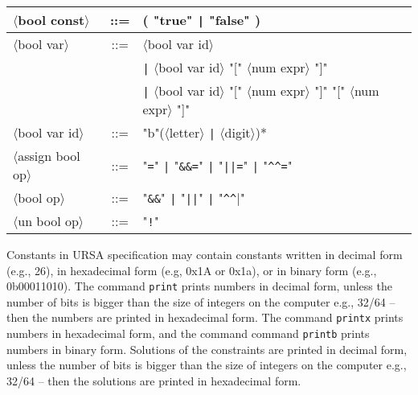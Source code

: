 \documentclass[a4paper]{article}
\begin{document}
{\begin{center}
\begin{tabular}{lcl}
$\langle$bool const$\rangle$ & ::= & ( "true" \verb_|_ "false" )                                                                              \\ \hline

$\langle$bool var$\rangle$ & ::= & $\langle$bool var id$\rangle$                                                                              \\
               &     &     \verb_|_ $\langle$bool var id$\rangle$ "[" $\langle$num expr$\rangle$ "]"                                          \\
               &     &     \verb_|_ $\langle$bool var id$\rangle$ "[" $\langle$num expr$\rangle$ "]" "[" $\langle$num expr$\rangle$ "]"       \\ \hline

$\langle$bool var id$\rangle$ & ::= & "b"($\langle$letter$\rangle$ \verb_|_ $\langle$digit$\rangle$)*                                         \\ \hline

$\langle$assign bool op$\rangle$ & ::= & "\verb|=|" \verb_|_ "\verb|&&=|"  \verb_|_ "\verb_||=_" \verb_|_ "\verb|^^=|"                        \\ \hline
$\langle$bool op$\rangle$        & ::= & "\verb|&&|"  \verb_|_ "\verb_||_" \verb_|_ "\verb|^^|"                                               \\ \hline
$\langle$un bool op$\rangle$     & ::= & "\verb|!|"                                                                                           \\ \hline
\end{tabular}
\end{center}
}

Constants in URSA specification may contain constants written in decimal form (e.g., 26), 
in hexadecimal form (e.g, 0x1A or 0x1a), or in binary form (e.g., 0b00011010).
The command \verb|print| prints numbers in decimal form, unless the number of bits is
bigger than the size of integers on the computer e.g., 32/64 -- then the numbers are
printed in hexadecimal form. The command \verb|printx| prints numbers in hexadecimal 
form, and the command command \verb|printb| prints numbers in binary form.
Solutions of the constraints are printed in decimal form, unless the number of bits is
bigger than the size of integers on the computer e.g., 32/64 -- then the solutions are
printed in hexadecimal form.
\end{document}
